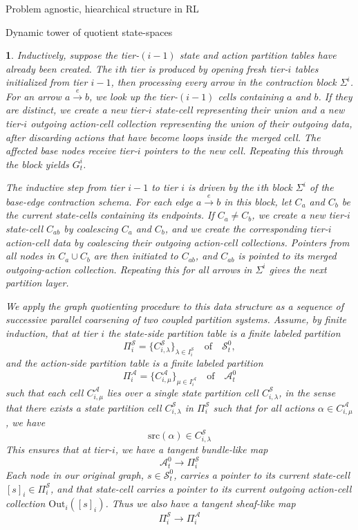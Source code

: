 \documentclass[11pt]{article}
\newtheorem{ermark}[subsubsection]{}
\begin{document}
\begin{section}{Problem agnostic, hiearchical structure in RL}
\begin{subsection}{Dynamic tower of quotient state-spaces}
\begin{ermark}
Inductively, suppose the tier-$(i-1)$ state and action partition tables have already been created. The $i$th tier is produced by opening fresh tier-$i$ tables initialized from tier $i-1$, then processing every arrow in the contraction block $\Sigma^i$. For an arrow $a\xrightarrow{\ e\ }b$, we look up the tier-$(i-1)$ cells containing $a$ and $b$. If they are distinct, we create a new tier-$i$ state-cell representing their union and a new tier-$i$ outgoing action-cell collection representing the union of their outgoing data, after discarding actions that have become loops inside the merged cell. The affected base nodes receive tier-$i$ pointers to the new cell. Repeating this through the block yields $G_t^i$.

The inductive step from tier $i-1$ to tier $i$ is driven by the $i$th block $\Sigma^i$ of the base-edge contraction schema. For each edge $a\xrightarrow{\ e\ }b$ in this block, let $C_a$ and $C_b$ be the current state-cells containing its endpoints. If $C_a\neq C_b$, we create a new tier-$i$ state-cell $C_{ab}$ by coalescing $C_a$ and $C_b$, and we create the corresponding tier-$i$ action-cell data by coalescing their outgoing action-cell collections. Pointers from all nodes in $C_a\cup C_b$ are then initiated to $C_{ab}$, and $C_{ab}$ is pointed to its merged outgoing-action collection. Repeating this for all arrows in $\Sigma^i$ gives the next partition layer.

We apply the graph quotienting procedure to this data structure as a sequence of successive parallel coarsening of two coupled partition systems. Assume, by finite induction, that at tier $i$ the \emph{state-side partition table} is a finite labeled partition
\[
\Pi_i^{\mathcal S}=\{C_{i,\lambda}^{\mathcal S}\}_{\lambda\in I_i^{\mathcal S}}
\quad\text{of}\quad\mathcal{S}_t^0,
\]
and the \emph{action-side partition table} is a finite labeled partition
\[
\Pi_i^{\mathcal A}=\{C_{i,\mu}^{\mathcal A}\}_{\mu\in I_i^{\mathcal A}}
\quad\text{of}\quad\mathcal{A}_t^0
\]
such that each cell $C_{i,\mu}^{\mathcal A}$ lies over a single state partition cell $C_{i,\lambda}^{\mathcal S}$, in the sense that there exists a state partition cell $C_{i,\lambda}^{\mathcal S}$ in $\Pi_i^{\mathcal S}$ such that for all actions $\alpha\in C_{i,\mu}^{\mathcal A}$, we have
	$$
	\text{src}(\alpha)\in C_{i,\lambda}^{\mathcal S}
	$$
This ensures that at tier-$i$, we have a tangent bundle-like map 
$$
\mathcal{A}^{0}_{t}\longrightarrow\Pi_i^{\mathcal S}
$$
Each node in our original graph, $s\in\mathcal{S}_t^0$, carries a pointer to its current state-cell $[s]_i\in\Pi_i^{\mathcal S}$, and that state-cell carries a pointer to its current outgoing action-cell collection $\mathrm{Out}_i([s]_i)$. Thus we also have a tangent sheaf-like map
$$
\Pi_i^{\mathcal S}\longrightarrow\Pi_i^{\mathcal A}
$$


\end{ermark}
\end{subsection}
\end{section}
\end{document}
